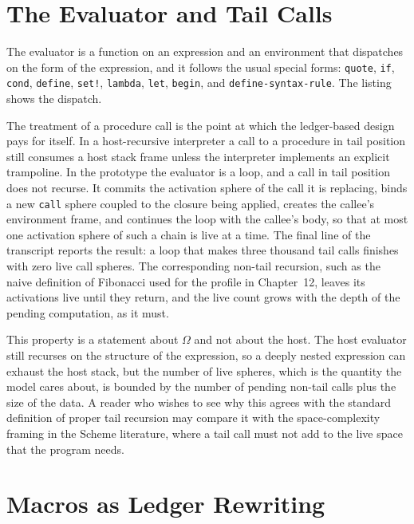 
\section{The Evaluator and Tail Calls}

The evaluator is a function on an expression and an environment that dispatches on the form of the expression, and it follows the usual special forms: \texttt{quote}, \texttt{if}, \texttt{cond}, \texttt{define}, \texttt{set!}, \texttt{lambda}, \texttt{let}, \texttt{begin}, and \texttt{define-syntax-rule}. The listing shows the dispatch.


The treatment of a procedure call is the point at which the ledger-based design pays for itself. In a host-recursive interpreter a call to a procedure in tail position still consumes a host stack frame unless the interpreter implements an explicit trampoline. In the prototype the evaluator is a loop, and a call in tail position does not recurse. It commits the activation sphere of the call it is replacing, binds a new \texttt{call} sphere coupled to the closure being applied, creates the callee's environment frame, and continues the loop with the callee's body, so that at most one activation sphere of such a chain is live at a time. The final line of the transcript reports the result: a loop that makes three thousand tail calls finishes with zero live call spheres. The corresponding non-tail recursion, such as the naive definition of Fibonacci used for the profile in Chapter~12, leaves its activations live until they return, and the live count grows with the depth of the pending computation, as it must.


This property is a statement about $\Omega$ and not about the host. The host evaluator still recurses on the structure of the expression, so a deeply nested expression can exhaust the host stack, but the number of live spheres, which is the quantity the model cares about, is bounded by the number of pending non-tail calls plus the size of the data. A reader who wishes to see why this agrees with the standard definition of proper tail recursion may compare it with the space-complexity framing in the Scheme literature, where a tail call must not add to the live space that the program needs.

\section{Macros as Ledger Rewriting}


